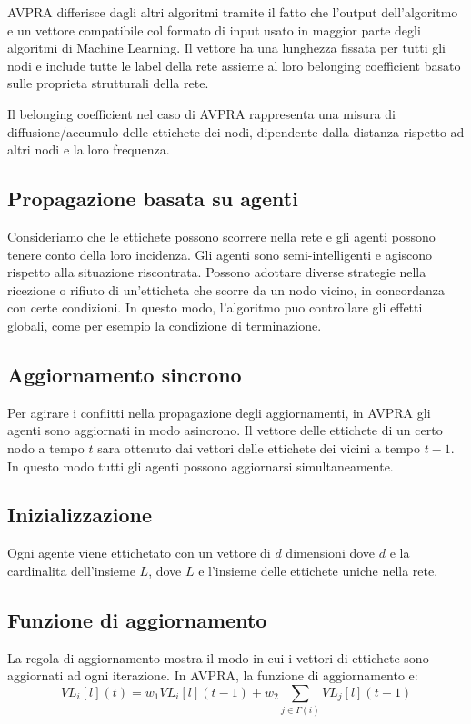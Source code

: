 \documentclass[a4paper,12pt]{report}
\begin{document}
	AVPRA differisce dagli altri algoritmi tramite il fatto che l'output dell'algoritmo e un vettore compatibile col formato di input usato in maggior parte degli algoritmi di Machine Learning. Il vettore ha una lunghezza fissata per tutti gli nodi e include tutte le label della rete assieme al loro belonging coefficient basato sulle proprieta strutturali della rete. 

	Il belonging coefficient nel caso di AVPRA rappresenta una misura di diffusione/accumulo delle ettichete dei nodi, dipendente dalla distanza rispetto ad altri nodi e la loro frequenza. \cite{avpra} 

		\subsection{Propagazione basata su agenti}
		Consideriamo che le ettichete possono scorrere nella rete e gli agenti possono tenere conto della loro incidenza. Gli agenti sono semi-intelligenti e agiscono rispetto alla situazione riscontrata. Possono adottare diverse strategie nella ricezione o rifiuto di un'etticheta che scorre da un nodo vicino, in concordanza con certe condizioni. In questo modo, l'algoritmo puo controllare gli effetti globali, come per esempio la condizione di terminazione.

		\subsection{Aggiornamento sincrono}
		Per agirare i conflitti nella propagazione degli aggiornamenti, in AVPRA gli agenti sono aggiornati in modo asincrono. Il vettore delle ettichete di un certo nodo a tempo $t$ sara ottenuto dai vettori delle ettichete dei vicini a tempo $t-1$. In questo modo tutti gli agenti possono aggiornarsi simultaneamente.
	
		\subsection{Inizializzazione}
		Ogni agente viene ettichetato con un vettore di $d$ dimensioni dove $d$ e la cardinalita dell'insieme $L$, dove $L$ e l'insieme delle ettichete uniche nella rete. 

		\subsection{Funzione di aggiornamento}
		La regola di aggiornamento mostra il modo in cui i vettori di ettichete sono aggiornati ad ogni iterazione. In AVPRA, la funzione di aggiornamento e:
		\begin{equation}
		VL_i [l] (t) = w_1 VL_i [l] (t-1) + w_2 \sum_{j \in \Gamma(i)} VL_j [l](t-1)
		\end{equation}
\end{document}
